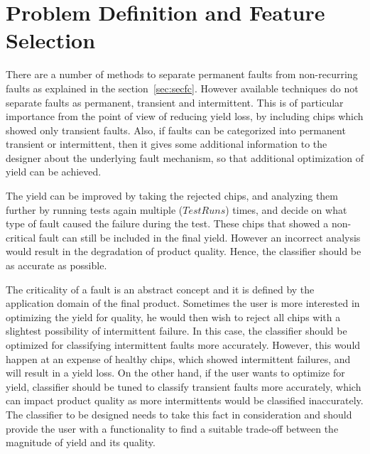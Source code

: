 \chapter{Problem Definition and Feature Selection}
\label{chap:chapter4}

There are a number of methods to separate permanent faults from non-recurring faults as explained in the section~\ref{sec:secfc}. However available techniques do not separate faults as permanent, transient and intermittent. This is of particular importance from the point of view of reducing yield loss, by including chips which showed only transient faults. Also, if faults can be categorized into permanent transient or intermittent, then it gives some additional information to the designer about the underlying fault mechanism, so that additional optimization of yield can be achieved. 

The yield can be improved by taking the rejected chips, and analyzing them further by running tests again multiple ($TestRuns$) times, and decide on what type of fault caused the failure during the test. These chips that showed a non-critical fault can still be included in the final yield. However an incorrect analysis would result in the degradation of product quality. Hence, the classifier should be as accurate as possible.

The criticality of a fault is an abstract concept and it is defined by the application domain of the final product. Sometimes the user is more interested in optimizing the yield for quality, he would then wish to reject all chips with a slightest possibility of intermittent failure. In this case, the classifier should be optimized for classifying intermittent faults more accurately. However, this would happen at an expense of healthy chips, which showed intermittent failures, and will result in a yield loss. On the other hand, if the user wants to optimize for yield, classifier should be tuned to classify transient faults more accurately, which can impact product quality as more intermittents would be classified inaccurately. The classifier to be designed needs to take this fact in consideration and should provide the user with a functionality to find a suitable trade-off between the magnitude of yield and its quality.

